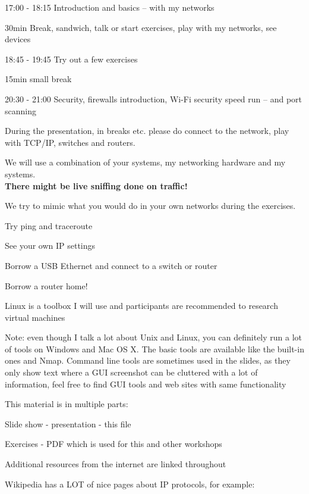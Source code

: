 \documentclass[Screen16to9,17pt]{foils}
\begin{document}

\begin{list2}
\item 17:00 - 18:15 Introduction and basics -- with my networks
\item 30min Break, sandwich, talk or start exercises, play with my networks, see devices
\item 18:45 - 19:45 Try out a few exercises
\item 15min small break
\item 20:30 - 21:00 Security, firewalls introduction, Wi-Fi security speed run -- and port scanning
\end{list2}

During the presentation, in breaks etc. please do connect to the network, play with TCP/IP, switches and routers.


We will use a combination of your systems, my networking hardware and my systems.\\
{\color{red} \bf There might be live sniffing done on traffic!}

We try to mimic what you would do in your own networks during the exercises.

\begin{list2}
\item Try ping and traceroute
\item See your own IP settings
\item Borrow a USB Ethernet and connect to a switch or router
\item Borrow a router home!
\end{list2}

Linux is a toolbox I will use and participants are recommended to research virtual machines

Note: even though I talk a lot about Unix and Linux, you can definitely run a lot of tools on Windows and Mac OS X. The basic tools are available like the built-in ones and Nmap. Command line tools are sometimes used in the slides, as they only show text where a GUI screenshot can be cluttered with a lot of information, feel free to find GUI tools and web sites with same functionality



\begin{list2}
\item This material is in multiple parts:

\item Slide show - presentation - this file
\item Exercises - PDF which is used for this and other workshops
\item Additional resources from the internet are linked throughout
\item Wikipedia has a LOT of nice pages about IP protocols, for example:
\end{list2}
\end{document}

